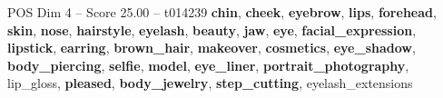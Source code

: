 \begin{textsample}{POS Dim 4 – Score 25.00 – t014239}  \label{ex:f4_pos_010}
\textbf{chin}, \textbf{cheek}, \textbf{eyebrow}, \textbf{lips}, \textbf{forehead}, \textbf{skin}, \textbf{nose}, \textbf{hairstyle}, \textbf{eyelash}, \textbf{beauty}, \textbf{jaw}, \textbf{eye}, \textbf{facial\_expression}, \textbf{lipstick}, \textbf{earring}, \textbf{brown\_hair}, \textbf{makeover}, \textbf{cosmetics}, \textbf{eye\_shadow}, \textbf{body\_piercing}, \textbf{selfie}, \textbf{model}, \textbf{eye\_liner}, \textbf{portrait\_photography}, lip\_gloss, \textbf{pleased}, \textbf{body\_jewelry}, \textbf{step\_cutting}, eyelash\_extensions

\end{textsample}

